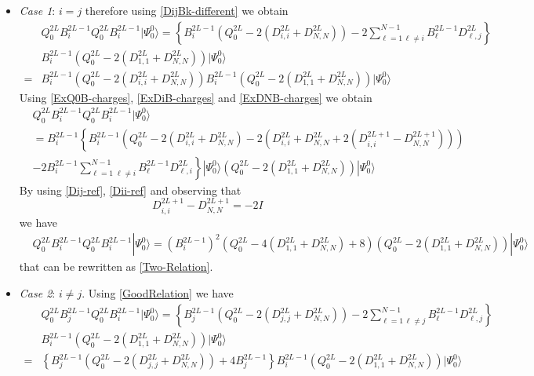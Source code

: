 \documentclass[10pt]{article}
\numberwithin{equation}{section}
\numberwithin{equation}{subsection}
\begin{document}
\begin{itemize}
	\item \textit{Case 1}: $i=j$ therefore using \eqref{DijBk-different} we obtain 
	\begin{align}
		&Q_{0}^{2L}B_{i}^{2L-1}Q_{0}^{2L}B_{i}^{2L-1}|\Psi_{0}^{0}\rangle=\left\{B_{i}^{2L-1}\left(Q_{0}^{2L}-2(D_{i,i}^{2L}+D_{N,N}^{2L})\right)-2\sum_{\ell=1\,\ell\neq i}^{N-1}B_{\ell}^{2L-1}D_{\ell,j}^{2L}\right\}\nonumber\\&B_{i}^{2L-1}\left(Q_{0}^{2L}-2(D_{1,1}^{2L}+D_{N,N}^{2L})\right)|\Psi_{0}^{0}\rangle
		\\=&
		B_{i}^{2L-1}\left(Q_{0}^{2L}-2(D_{i,i}^{2L}+D_{N,N}^{2L})\right)B_{i}^{2L-1}\left(Q_{0}^{2L}-2(D_{1,1}^{2L}+D_{N,N}^{2L})\right)|\Psi_{0}^{0}\rangle
	\end{align}
Using \eqref{ExQ0B-charges}, \eqref{ExDiB-charges} and \eqref{ExDNB-charges} we obtain 
\begin{align}
	&Q_{0}^{2L}B_{i}^{2L-1}Q_{0}^{2L}B_{i}^{2L-1}|\Psi_{0}^{0}\rangle\nonumber\\&=B_{i}^{2L-1}\left\{B_{i}^{2L-1}\left(Q_{0}^{2L}-2(D_{i,i}^{2L}+D_{N,N}^{2L})-2(D_{i,i}^{2L}+D_{N,N}^{2L}+2(D_{i,i}^{2L+1}-D_{N,N}^{2L+1}))\right)\right.\nonumber\\&\left.-2B_{i}^{2L-1}\sum_{\ell=1\;\ell\neq i}^{N-1}B_{\ell}^{2L-1}D_{\ell,i}^{2L}\right\}|\Psi_{0}^{0}\rangle
	\left(Q_{0}^{2L}-2(D_{1,1}^{2L}+D_{N,N}^{2L})\right)|\Psi_{0}^{0}\rangle
\end{align}
By using \eqref{Dij-ref}, \eqref{Dii-ref} and observing that 
\begin{equation}\label{D2Lp1}
	D_{i,i}^{2L+1}-D_{N,N}^{2L+1}=-2I
\end{equation}
we have 
\begin{align}
	&Q_{0}^{2L}B_{i}^{2L-1}Q_{0}^{2L}B_{i}^{2L-1}|\Psi_{0}^{0}\rangle\nonumber=\left(B_{i}^{2L-1}\right)^{2}\left(Q_{0}^{2L}-4(D_{1,1}^{2L}+D_{N,N}^{2L})+8\right)\left(Q_{0}^{2L}-2(D_{1,1}^{2L}+D_{N,N}^{2L})\right)|\Psi_{0}^{0}\rangle
\end{align}
that can be rewritten as \eqref{Two-Relation}.
\item \textit{Case 2}: $i\neq j$. Using \eqref{GoodRelation} we have
\begin{align}
	&Q_{0}^{2L}B_{j}^{2L-1}Q_{0}^{2L}B_{i}^{2L-1}|\Psi_{0}^{0}\rangle=\left\{B_{j}^{2L-1}\left(Q_{0}^{2L}-2(D_{j,j}^{2L}+D_{N,N}^{2L})\right)-2\sum_{\ell=1\,\ell\neq j}^{N-1}B_{\ell}^{2L-1}D_{\ell,j}^{2L}\right\}\\&
	B_{i}^{2L-1}\left(Q_{0}^{2L}-2(D_{1,1}^{2L}+D_{N,N}^{2L})\right)|\Psi_{0}^{0}\rangle\nonumber\\=&\left\{B_{j}^{2L-1}\left(Q_{0}^{2L}-2(D_{j,j}^{2L}+D_{N,N}^{2L})\right)+4B_{j}^{2L-1}\right\}B_{i}^{2L-1}\left(Q_{0}^{2L}-2(D_{1,1}^{2L}+D_{N,N}^{2L})\right)|\Psi_{0}^{0}\rangle

\end{align}
\end{itemize}
\end{document}
